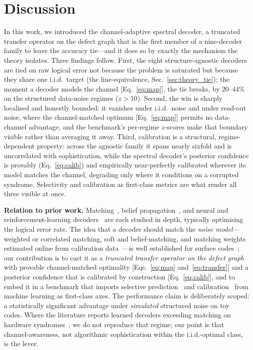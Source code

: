 \documentclass[reprint,aps,prxquantum,amsmath,amssymb,floatfix,nofootinbib,longbibliography]{revtex4-2}
\theoremstyle{definition}
\theoremstyle{remark}
\theoremstyle{plain}
\begin{document}
\section{Discussion}
\label{sec:discussion}

In this work, we introduced the channel-adaptive spectral decoder, a truncated transfer operator on the defect graph that is the first member of a nine-decoder family to leave the accuracy tie---and it does so by exactly the mechanism the theory isolates. Three findings follow. First, the eight structure-agnostic decoders are tied on raw logical error not because the problem is saturated but because they share one i.i.d.\ target (the line-equivalence, Sec.~\ref{sec:theory_tie}); the moment a decoder models the channel [Eq.~\eqref{eq:map}], the tie breaks, by $20$--$44\%$ on the structured data-noise regimes ($z>10$). Second, the win is sharply localised and honestly bounded: it vanishes under i.i.d.\ noise and under read-out noise, where the channel-matched optimum [Eq.~\eqref{eq:map}] permits no data-channel advantage, and the benchmark's per-regime $z$-scores make that boundary visible rather than averaging it away. Third, calibration is a structural, regime-dependent property: across the agnostic family it spans nearly sixfold and is uncorrelated with sophistication, while the spectral decoder's posterior confidence is provably (Eq.~\eqref{eq:calib}) and empirically near-perfectly calibrated wherever its model matches the channel, degrading only where it conditions on a corrupted syndrome. Selectivity and calibration as first-class metrics are what render all three visible at once.

\textbf{Relation to prior work.} Matching~\cite{dennis2002topological,fowler2012surface,higgott2022pymatching}, belief propagation~\cite{poulin2008iterative,roffe2020decoding}, and neural and reinforcement-learning decoders~\cite{torlai2017neural,varsamopoulos2017decoding,sweke2020reinforcement,bausch2024learning} are each studied in depth, typically optimising the logical error rate. The idea that a decoder should match the \emph{noise model}---weighted or correlated matching, soft and belief-matching, and matching weights estimated online from calibration data~\cite{spitz2018adaptive}---is well established for surface codes~\cite{higgott2022pymatching,roffe2020decoding}; our contribution is to cast it as a \emph{truncated transfer operator on the defect graph} with provable channel-matched optimality [Eqs.~\eqref{eq:map} and~\eqref{eq:transfer}] and a posterior confidence that is calibrated by construction [Eq.~\eqref{eq:calib}], and to embed it in a benchmark that imports selective prediction~\cite{chow1970optimum,geifman2017selective,elyaniv2010foundations} and calibration~\cite{guo2017calibration} from machine learning as first-class axes. The performance claim is deliberately scoped: a statistically significant advantage under \emph{simulated} structured noise on toy codes. Where the literature reports learned decoders exceeding matching on hardware syndromes~\cite{bausch2024learning}, we do not reproduce that regime; our point is that channel-awareness, not algorithmic sophistication within the i.i.d.-optimal class, is the lever.
\end{document}
